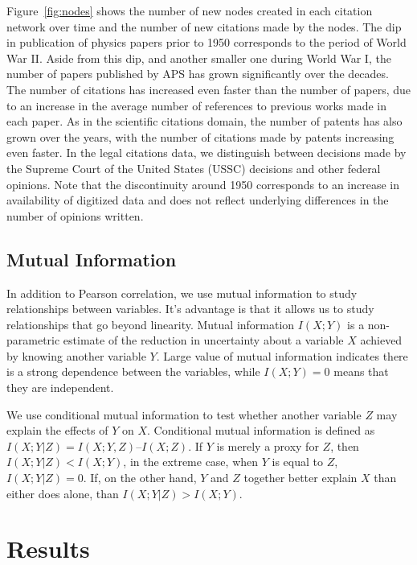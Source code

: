 \documentclass[10pt]{bmc_article}
\newenvironment{bmcformat}{\baselineskip20pt\sloppy\setboolean{publ}{false}}{\baselineskip20pt\sloppy}
\begin{document}
\begin{bmcformat}
Figure~\ref{fig:nodes} shows the number of new nodes created in each citation network over time and the number of new citations made by the nodes. The dip in publication of physics papers prior to 1950 corresponds to the period of World War II. Aside from this dip, and another smaller one during World War I, the number of papers published by APS has grown significantly over the decades. The number of citations has increased even faster than the number of papers, due to an increase in the average number of references to previous works made in each paper. As in the scientific citations domain, the number of patents has also grown over the years, with the number of citations made by patents increasing even faster. In the legal citations data, we distinguish between decisions made by the Supreme Court of the United States (USSC) decisions and other federal opinions. Note that the discontinuity around 1950 corresponds to an increase in availability of digitized data and does not reflect underlying differences in the number of opinions written.

\subsection{Mutual Information}
In addition to Pearson correlation, we use mutual information to study relationships between variables. It's advantage is that it allows us to study relationships that go beyond linearity.
Mutual information $I(X;Y)$ is a non-parametric estimate of the reduction in uncertainty about a variable $X$ achieved by knowing another variable $Y$.
Large value of mutual information indicates there is a strong dependence between the variables, while $I(X;Y)=0$ means that they are independent.

We use conditional mutual information to test whether another variable $Z$ may explain the effects of $Y$ on $X$. Conditional mutual information is defined as  $I(X;Y|Z) = I(X;Y,Z) – I(X;Z)$.
If $Y$ is merely a proxy for $Z$, then $I(X;Y|Z) < I(X;Y)$, in the extreme case, when $Y$ is equal to $Z$, $I(X;Y|Z)=0$. If, on the other hand, $Y$ and $Z$ together better explain $X$ than either does alone, than $I(X;Y | Z) > I(X; Y)$.

\section{Results}




\end{bmcformat}
\end{document}
